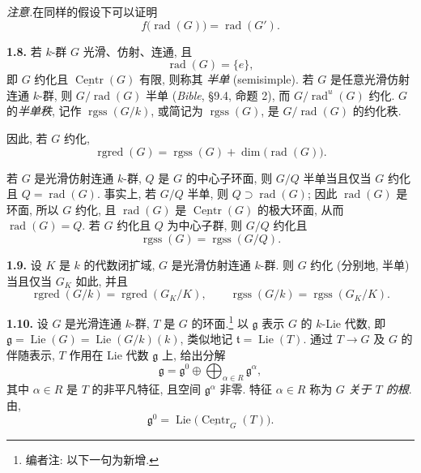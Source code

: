 \noindent\textit{注意.}\quad 在同样的假设下可以证明
\[
  f\bigl(\operatorname{rad}(G)\bigr)=\operatorname{rad}(G').
\]

\par\medskip\noindent{}\textbf{1.8.}\quad
若 \(k\)-群 \(G\) 光滑、仿射、连通, 且
\[
  \operatorname{rad}(G)=\{e\},
\]
即 \(G\) 约化且 \(\underline{\operatorname{Centr}}(G)\) 有限, 则称其 \emph{半单} (semisimple). 若 \(G\) 是任意光滑仿射连通 \(k\)-群, 则 \(G/\operatorname{rad}(G)\) 半单 (\emph{Bible}, §9.4, 命题 2), 而 \(G/\operatorname{rad}^{u}(G)\) 约化. \(G\) 的\emph{半单秩}, 记作 \(\operatorname{rgss}(G/k)\), 或简记为 \(\operatorname{rgss}(G)\), 是 \(G/\operatorname{rad}(G)\) 的约化秩.

因此, 若 \(G\) 约化,
\[
  \operatorname{rgred}(G)
  =
  \operatorname{rgss}(G)+\dim\bigl(\operatorname{rad}(G)\bigr).
\]

若 \(G\) 是光滑仿射连通 \(k\)-群, \(Q\) 是 \(G\) 的中心子环面, 则 \(G/Q\) 半单当且仅当 \(G\) 约化且 \(Q=\operatorname{rad}(G)\). 事实上, 若 \(G/Q\) 半单, 则 \(Q\supset\operatorname{rad}(G)\); 因此 \(\operatorname{rad}(G)\) 是环面, 所以 \(G\) 约化, 且 \(\operatorname{rad}(G)\) 是 \(\underline{\operatorname{Centr}}(G)\) 的极大环面, 从而 \(\operatorname{rad}(G)=Q\). 若 \(G\) 约化且 \(Q\) 为中心子群, 则 \(G/Q\) 约化且
\[
  \operatorname{rgss}(G)=\operatorname{rgss}(G/Q).
\]

\par\medskip\noindent{}\textbf{1.9.}\quad
设 \(K\) 是 \(k\) 的代数闭扩域, \(G\) 是光滑仿射连通 \(k\)-群. 则 \(G\) 约化 (分别地, 半单) 当且仅当 \(G_K\) 如此, 并且
\[
  \operatorname{rgred}(G/k)=\operatorname{rgred}(G_K/K),
  \qquad
  \operatorname{rgss}(G/k)=\operatorname{rgss}(G_K/K).
\]

\par\medskip\noindent{}\textbf{1.10.}\quad
设 \(G\) 是光滑连通 \(k\)-群, \(T\) 是 \(G\) 的环面.\footnote{编者注: 以下一句为新增.}
以 \(\mathfrak g\) 表示 \(G\) 的 \(k\)-Lie 代数, 即 \(\mathfrak g=\operatorname{Lie}(G)=\operatorname{Lie}(G/k)(k)\), 类似地记 \(\mathfrak t=\operatorname{Lie}(T)\). 通过 \(T\longrightarrow G\) 及 \(G\) 的伴随表示, \(T\) 作用在 Lie 代数 \(\mathfrak g\) 上, 给出分解
\begin{equation}
  \mathfrak g
  =
  \mathfrak g^{0}
  \oplus
  \bigoplus_{\alpha\in R}\mathfrak g^{\alpha},
  \tag{1.10.1}\label{sga3:xix:paragraph:1-10:equation:1-10-1}
\end{equation}
其中 \(\alpha\in R\) 是 \(T\) 的非平凡特征, 且空间 \(\mathfrak g^{\alpha}\) 非零. 特征 \(\alpha\in R\) 称为 \(G\) \emph{关于 \(T\) 的根}. 由,
\begin{equation}
  \mathfrak g^{0}
  =
  \operatorname{Lie}\bigl(\underline{\operatorname{Centr}}_{G}(T)\bigr).
  \tag{1.10.2}
\end{equation}

